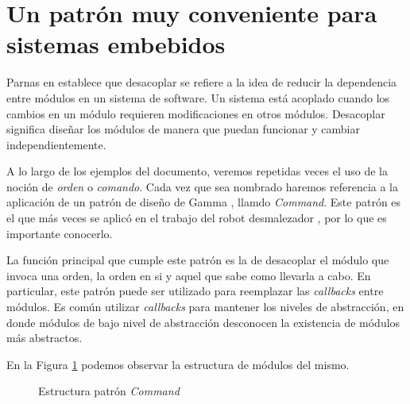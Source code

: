 \section{Un patrón muy conveniente para sistemas embebidos}

Parnas en \cite{Parnas1972} establece que desacoplar se refiere a la idea de reducir la dependencia entre módulos en un sistema de software. Un sistema está acoplado cuando los cambios en un módulo requieren modificaciones en otros módulos. Desacoplar significa diseñar los módulos de manera que puedan funcionar y cambiar independientemente.

A lo largo de los ejemplos del documento, veremos repetidas veces el uso de la noción de \textit{orden} o \textit{comando}. Cada vez que sea nombrado haremos referencia a la aplicación de un patrón de diseño de Gamma \cite{Gamma:1995:DPE:186897}, llamdo \textit{Command}. Este patrón es el que más veces se aplicó en el trabajo del robot desmalezador \cite{laura}, por lo que es importante conocerlo.

La función principal que cumple este patrón es la de desacoplar el módulo que invoca una orden, la orden en si y aquel que sabe como llevarla a cabo. En particular, este patrón puede ser utilizado para reemplazar las \textit{callbacks} entre módulos. Es común utilizar \textit{callbacks} para mantener los niveles de abstracción, en donde módulos de bajo nivel de abstracción desconocen la existencia de módulos más abstractos.

En la Figura \ref{commandEst} podemos observar la estructura de módulos del mismo.


\begin{figure}[H]
\caption{Estructura patrón \textit{Command}}
\label{commandEst}
\begin{center}
\end{center}
\end{figure}

